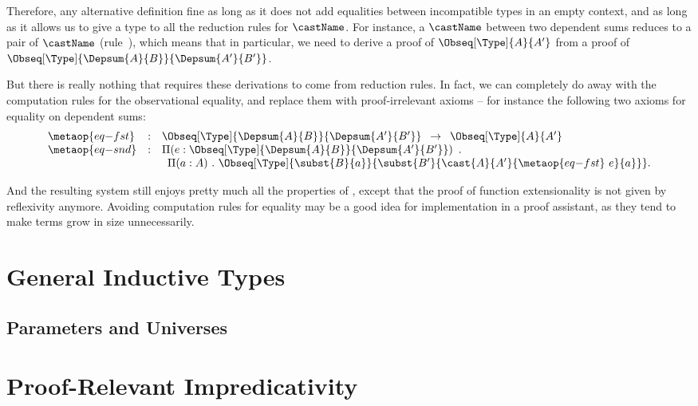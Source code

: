 Therefore, any alternative definition fine as long as it does not add 
equalities between incompatible types in an empty context, and as long as it allows us to
give a type to all the reduction rules for \( \castName \). 
% 
For instance, a \( \castName \) between two dependent sums reduces to a pair of 
\( \castName \) (rule~), which means that in 
particular, we need to derive a proof of \( \Obseq[\Type]{A}{A'} \) from a proof of 
\( \Obseq[\Type]{\Depsum{A}{B}}{\Depsum{A'}{B'}} \).

But there is really nothing that requires these derivations to come from 
reduction rules. In fact, we can completely do away with the computation rules
for the observational equality, and replace them with proof-irrelevant axioms
-- for instance the following two axioms for equality on dependent sums:
\[
\begin{array}{lcl}
\metaop{eq{-}fst} & : & \Obseq[\Type]{\Depsum{A}{B}}{\Depsum{A'}{B'}} \enskip \to \enskip \Obseq[\Type]{A}{A'} \\
\metaop{eq{-}snd} & : & \Pi (e : \Obseq[\Type]{\Depsum{A}{B}}{\Depsum{A'}{B'}}) \enskip . \\
& & \enskip \Pi (a : A)\ .\ \Obseq[\Type]{\subst{B}{a}}{\subst{B'}{\cast{A}{A'}{\metaop{eq{-}fst}\ e}{a}}}.
\end{array}
\]

And the resulting system still enjoys pretty much all the properties of 
\SetoidCC, except that the proof of function extensionality is not given by 
reflexivity anymore.
% 
Avoiding computation rules for equality may be a good idea for implementation 
in a proof assistant, as they tend to make terms grow in size unnecessarily.

\section{General Inductive Types}
\label{sec:general-inductives}

\subsection{Parameters and Universes}

\section{Proof-Relevant Impredicativity}
\label{sec:proof-rel-impred}

